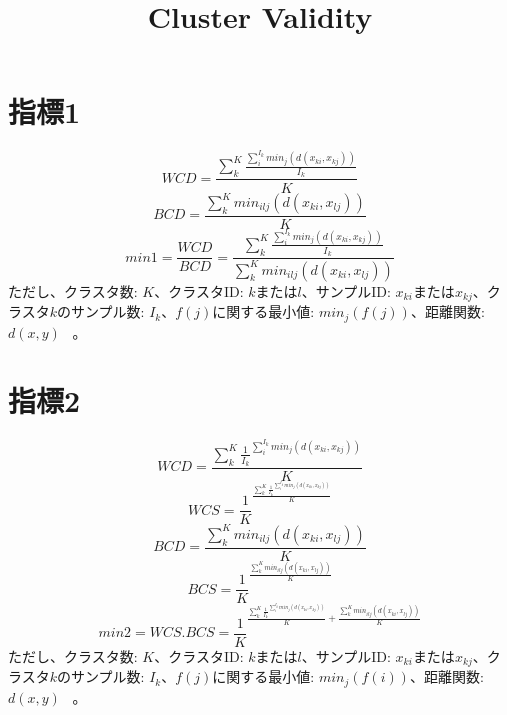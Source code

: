 \documentclass{article}
\title{Cluster Validity}
\begin{document}
\maketitle
\section{指標1}
\begin{equation}
WCD=\frac{\sum_{k}^{K}{\frac{\sum_{i}^{I_k}{min_j(d(x_{ki},x_{kj}))}}{I_k}}}{K}
\end{equation}
\begin{equation}
BCD=\frac{\sum_{k}^{K}{min_{ilj}(d(x_{ki},x_{lj}))}}{K}
\end{equation}
\begin{equation}
min1=\frac{WCD}{BCD}=\frac{\sum_{k}^{K}{\frac{\sum_{i}^{I_k}{min_j(d(x_{ki},x_{kj}))}}{I_k}}}{\sum_{k}^{K}{min_{ilj}(d(x_{ki},x_{lj}))}}
\end{equation}
ただし、クラスタ数: $K$、クラスタID: $k$または$l$、サンプルID: $x_{ki}$または$x_{kj}$、クラスタ$k$のサンプル数: $I_k$、$f(j)$に関する最小値: $min_j(f(j))$、距離関数:$d(x,y)$  \ 。

\section{指標2}
\begin{equation}
WCD=\frac{\sum_{k}^{K}{{\frac{1}{I_k}}^{\sum_{i}^{I_k}{min_j(d(x_{ki},x_{kj}))}}}}{K}
\end{equation}
\begin{equation}
WCS={\frac{1}{K}}^{\frac{\sum_{k}^{K}{{\frac{1}{I_k}}^{\sum_{i}^{I_k}{min_j(d(x_{ki},x_{kj}))}}}}{K}}
\end{equation}
\begin{equation}
BCD=\frac{\sum_{k}^{K}{min_{ilj}(d(x_{ki},x_{lj}))}}{K}
\end{equation}
\begin{equation}
BCS={\frac{1}{K}}^{\frac{\sum_{k}^{K}{min_{ilj}(d(x_{ki},x_{lj}))}}{K}}
\end{equation}
\begin{equation}
min2=WCS . BCS={\frac{1}{K}}^{\frac{\sum_{k}^{K}{{\frac{1}{I_k}}^{\sum_{i}^{I_k}{min_j(d(x_{ki},x_{kj}))}}}}{K} + \frac{\sum_{k}^{K}{min_{ilj}(d(x_{ki},x_{lj}))}}{K}}
\end{equation}
ただし、クラスタ数: $K$、クラスタID: $k$または$l$、サンプルID: $x_{ki}$または$x_{kj}$、クラスタ$k$のサンプル数: $I_k$、$f(j)$に関する最小値: $min_j(f(i))$、距離関数:$d(x,y)$  \ 。
\end{document}
